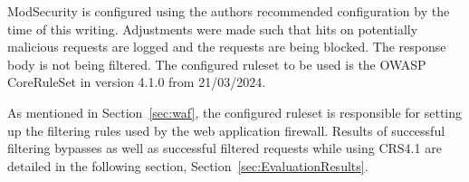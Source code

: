 ModSecurity is configured using the authors recommended configuration by the time of this writing. \cite{modsec/recconf}
Adjustments were made such that hits on potentially malicious requests are logged and the requests are being blocked. The response body is not being filtered.
The configured ruleset to be used is the OWASP CoreRuleSet in version 4.1.0 from 21/03/2024. \cite{crs/410dl}

As mentioned in Section~\ref{sec:waf}, the configured ruleset is responsible for setting up the filtering rules used by the web application firewall. Results of successful filtering bypasses as well as successful filtered requests while using CRS4.1 are detailed in the following section, Section~\ref{sec:EvaluationResults}.
